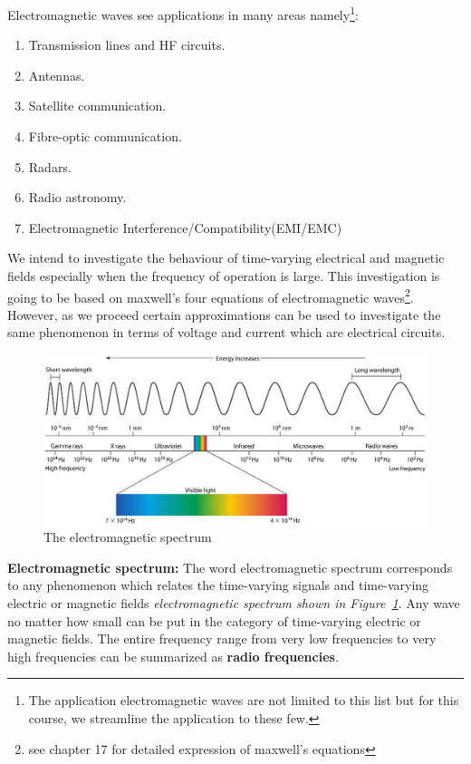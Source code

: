 Electromagnetic waves see applications in many areas namely\footnote{The application electromagnetic waves are not limited to this list but for this course, we streamline the application to these few.}:
\begin{enumerate}
\itemsep0em
\item Transmission lines and HF circuits.
\item Antennas.
\item Satellite communication.
\item Fibre-optic communication.
\item Radars.
\item Radio astronomy.
\item Electromagnetic Interference/Compatibility(EMI/EMC)
\end{enumerate}

We intend to investigate the behaviour of time-varying electrical and magnetic fields especially when the frequency of operation is large. This investigation is going to be based on maxwell's four equations of electromagnetic waves\footnote{see chapter 17 for detailed expression of maxwell's equations}. However, as we proceed certain approximations can be used to investigate the same phenomenon in terms of voltage and current which are electrical circuits.\\

\begin{figure}[h]
\centering
\includegraphics[width=1\linewidth]{./graphics/electromagneticspectrum}
\caption{The electromagnetic spectrum}
\label{fig:electromagneticspectrum}
\end{figure}

\textbf{Electromagnetic spectrum:} The word electromagnetic spectrum corresponds to any phenomenon which relates the time-varying signals and time-varying electric or magnetic fields \textit{electromagnetic spectrum shown in Figure~\ref{fig:electromagneticspectrum}}. Any wave no matter how small can be put in the category of time-varying electric or magnetic fields. The entire frequency range from very low frequencies to very high frequencies can be summarized as \textbf{radio frequencies}.\\

